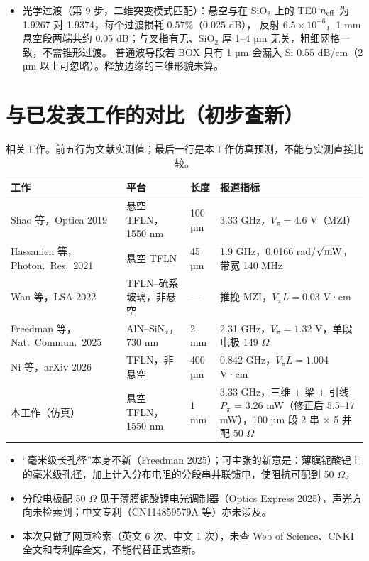 \documentclass[10pt,a4paper]{article}
\begin{document}
\begin{itemize}
        锚区引线轨（LN/SiO$_2$/高阻 Si，二维静电）约 0.1 pF/mm、0.5 nH/mm；节点分析计入引线轨、梁上走线、汇流条电阻和焊盘后，
        $L = 1$ mm 为 \textbf{3.26 mW}（500 nm 铝、50 µm 轨，比理想高 3--4\%），100 nm 薄铝窄轨最差约 3.7 mW；输入阻抗约 53--57 $\Omega$。
        两侧各走一对轨略优于一侧走轨 + 每个驱动间隙一座跨脊空气桥（差 1--5\%）；空气桥底离脊顶 0.5 µm 时每座附加光损耗约 $4\times10^{-5}$ dB，$\ge 1$ µm 时看不出。
  \item 光学过渡（第 9 步，二维突变模式匹配）：悬空与在 SiO$_2$ 上的 TE0 $n_{\rm eff}$ 为 1.9267 对 1.9374，每个过渡损耗 0.57\%（0.025 dB），
        反射 $6.5\times10^{-6}$，1 mm 悬空段两端共约 0.05 dB；与叉指有无、SiO$_2$ 厚 1--4 µm 无关，粗细网格一致，不需锥形过渡。
        普通波导段若 BOX 只有 1 µm 会漏入 Si 0.55 dB/cm（2 µm 以上可忽略）。释放边缘的三维形貌未算。
\end{itemize}

\section{与已发表工作的对比（初步查新）}
\begin{table}[h]
\centering\small
\caption{相关工作。前五行为文献实测值；最后一行是本工作仿真预测，不能与实测直接比较。}
\begin{tabular}{p{4.3cm}p{3.1cm}p{1.1cm}p{5.9cm}}
\toprule
工作 & 平台 & 长度 & 报道指标 \\
\midrule
Shao 等，Optica 2019 & 悬空 TFLN，1550 nm & 100 µm & 3.33 GHz，$V_\pi = 4.6$ V（MZI） \\
Hassanien 等，Photon.\ Res.\ 2021 & 悬空 TFLN & 45 µm & 1.9 GHz，0.0166 rad/$\sqrt{\rm mW}$，带宽 140 MHz \\
Wan 等，LSA 2022 & TFLN--硫系玻璃，非悬空 & — & 推挽 MZI，$V_\pi L = 0.03$ V·cm \\
Freedman 等，Nat.\ Commun.\ 2025 & AlN--SiN$_x$，730 nm & 2 mm & 2.31 GHz，$V_\pi = 1.32$ V，单段电极 149 $\Omega$ \\
Ni 等，arXiv 2026 & TFLN，非悬空 & 400 µm & 0.842 GHz，$V_\pi L = 1.004$ V·cm \\
\midrule
本工作（仿真） & 悬空 TFLN，1550 nm & 1 mm & 3.33 GHz，三维 + 梁 + 引线 $P_\pi$ = 3.26 mW（修正后 5.5--17 mW），100 µm 段 2 串 × 5 并配 50 $\Omega$ \\
\bottomrule
\end{tabular}
\end{table}

\begin{itemize}
  \item “毫米级长孔径”本身不新（Freedman 2025）；可主张的新意是：薄膜铌酸锂上的毫米级孔径，加上计入分布电阻的分段串并联馈电，使阻抗可配到 50 $\Omega$。
  \item 分段电极配 50 $\Omega$ 见于薄膜铌酸锂电光调制器（Optics Express 2025），声光方向未检索到；中文专利（CN114859579A 等）亦未涉及。
  \item 本次只做了网页检索（英文 6 次、中文 1 次），未查 Web of Science、CNKI 全文和专利库全文，不能代替正式查新。
\end{itemize}
\end{document}
